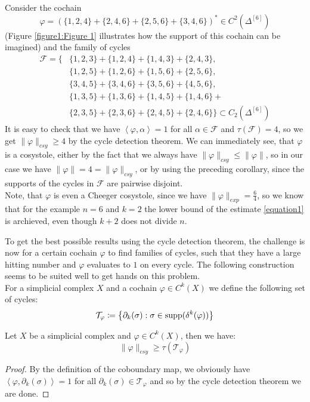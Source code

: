 \begin{expl}\label{example1a}
Consider the cochain
\[
\varphi=\left(\{1,2,4\}+\{2,4,6\}+\{2,5,6\}+\{3,4,6\}\right)^*\in C^2(\Delta^{[6]})
\]
(Figure \ref{figure1:Figure 1} illustrates how the support of this cochain can be imagined) and the family of cycles
\begin{align*}
\mathcal{F}=\{&\{1,2,3\}+\{1,2,4\}+\{1,4,3\}+\{2,4,3\},\\
&\{1,2,5\}+\{1,2,6\}+\{1,5,6\}+\{2,5,6\},\\
&\{3,4,5\}+\{3,4,6\}+\{3,5,6\}+\{4,5,6\},\\
&\{1,3,5\}+\{1,3,6\}+\{1,4,5\}+\{1,4,6\}+\\
&\{2,3,5\}+\{2,3,6\}+\{2,4,5\}+\{2,4,6\}\}\subset C_2(\Delta^{[6]})
\end{align*}
It is easy to check that we have \(\left\langle\varphi,\alpha\right\rangle=1\) for all \(\alpha\in\mathcal{F}\) and \(\tau(\mathcal{F})=4\), so we get \(\|\varphi\|_{csy}\geq 4\) by the cycle detection theorem. We can immediately see, that \(\varphi\) is a cosystole, either by the fact that we always have \(\|\varphi\|_{csy}\leq \|\varphi\|\), so in our case we have \(\|\varphi\|=4=\|\varphi\|_{csy}\), or by using the preceding corollary, since the supports of the cycles in \(\mathcal{F}\) are pairwise disjoint.\\
Note, that \(\varphi\) is even a Cheeger cosystole, since we have \(\|\varphi\|_{exp}=\frac{6}{4}\), so we know that for the example \(n=6\) and \(k=2\) the lower bound of the estimate \ref{equation1} is archieved, even though \(k+2\) does not divide \(n\).
\end{expl}



To get the best possible results using the cycle detection theorem, the challenge is now for a certain cochain \(\varphi\) to find families of cycles, such that they have a large hitting number and \(\varphi\) evaluates to \(1\) on every cycle. The following construction seems to be suited well to get hands on this problem.\\
For a simplicial complex \(X\) and a cochain \(\varphi\in C^k(X)\) we define the following set of cycles:
\[
\mathcal{T}_{\varphi}\coloneqq \left\{\partial_k(\sigma):\sigma\in \mathrm{supp}(\delta^k(\varphi))\right\}
\]

\begin{prop}\label{proposition1a}
Let \(X\) be a simplicial complex and \(\varphi\in C^k(X)\), then we have:
\[
\|\varphi\|_{csy}\geq\tau(\mathcal{T}_{\varphi})
\]
\begin{proof}
By the definition of the coboundary map, we obviously have\\
\(\left\langle\varphi,\partial_k(\sigma)\right\rangle=1\) for all \(\partial_k(\sigma)\in\mathcal{T}_{\varphi}\) and so by the cycle detection theorem we are done.
\end{proof}
\end{prop}


